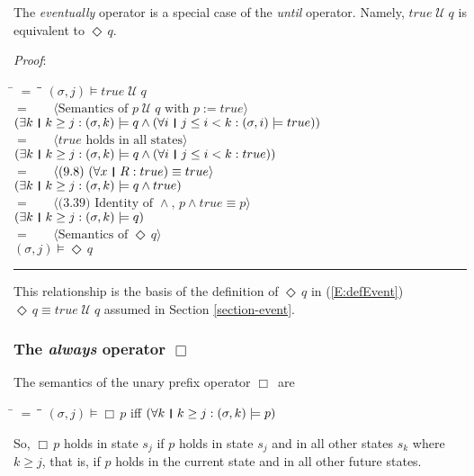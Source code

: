 \documentclass[12pt, fleqn, leqno]{article}
\newcommand{\lgap}{2pt}                             %
\newcommand{\mymathindent}{24pt}                    %
\newcommand{\Until}{\;\mathcal{U}\;}
\newcommand{\Event}{\Diamond\,}
\newcommand{\Always}{\Box\,}
\newcommand{\myqed}{\rule[-.23ex]{1.2ex}{2.0ex}}
\newcommand{\myqedtab}{\hspace{384pt}}              %
\newcommand{\thedr}{\rule[-.25ex]{.32mm}{1.75ex}}   %
\newcommand{\dr}{\;\,\thedr\,\;}                    %
\newcommand{\rb}{:}                                 %
\newcommand{\all}{\forall}                          %
\newcommand{\ext}{\exists}                          %
\newcommand{\Gll} {\langle}                         %
\newcommand{\Ggg} {\rangle}                         %
\newcommand{\Hint}[1]     {\ \ \ $\Gll              \mbox{#1} \Ggg$ }   %
\begin{document}
The \textit{eventually} operator is a special case of the \textit{until} operator.
Namely, $true \Until q$ is equivalent to $\Event q$.

\emph{Proof}:
\begin{tabbing}
\hspace{\mymathindent} \= $= \;$ \= \myqedtab \= \kill
	\> \>   $(\sigma, j) \models true\Until q$\\[\lgap]
	\> $=$  \>  \Hint{Semantics of $p\Until q$ with $p:=true$}\\[\lgap]
	\> \>   $(\ext k \dr k \ge j \rb (\sigma,k) \models q \land (\all i \dr j\le i < k \rb (\sigma,i) \models true))$\\[\lgap]
	\> $=$  \>  \Hint{$true$ holds in all states}\\[\lgap]
	\> \>   $(\ext k \dr k \ge j \rb (\sigma,k) \models q \land (\all i \dr j\le i < k \rb true))$\\[\lgap]
	\> $=$  \>  \Hint{(9.8) $(\all x\dr R\rb true)\equiv true$}\\[\lgap]
	\> \>   $(\ext k \dr k \ge j \rb (\sigma,k) \models q \land true)$\\[\lgap]
	\> $=$  \>  \Hint{(3.39) Identity of $\land$, $p \land true \equiv p$}\\[\lgap]
	\> \>   $(\ext k \dr k \ge j \rb (\sigma,k) \models q)$\\[\lgap]
	\> $=$  \>  \Hint{Semantics of $\Event q$}\\[\lgap]
	\> \>   $(\sigma, j) \models \Event q$ \quad \myqed
\end{tabbing}
This relationship is the basis of the definition of $\Event q$ in (\ref{E:defEvent}) $\Event q \equiv true \Until q$
assumed in Section \ref{section-event}.

\subsubsection*{The \textit{always} operator $\Always$}

The semantics of the unary prefix operator $\Always$ are
\begin{tabbing}
\hspace{\mymathindent} \= $= \;$ \= \myqedtab \= \kill
  \> $(\sigma, j) \models \Always p$ \quad iff \quad $(\all k \dr k \ge j \rb (\sigma,k) \models p)$
\end{tabbing}
So, $\Always p$ holds in state $s_j$ if $p$ holds in state $s_j$ and in all other states $s_k$ where $k\ge j$,
that is, if $p$ holds in the current state and in all other future states.
\end{document}

